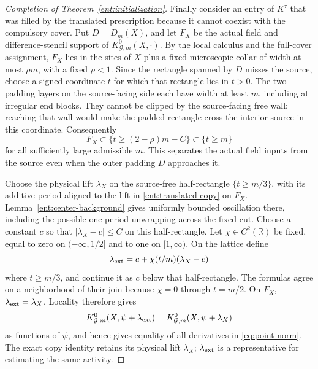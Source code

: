 \begin{proof}[Completion of Theorem~\ref{ent:initialization}]
Finally consider an entry of \(K^\tau\) that was filled
by the translated prescription because it cannot
coexist with the compulsory cover.  Put \(D=D_m(X)\), and let
\(F_X\) be the actual field and difference-stencil support of
\(K_{\mathcal G,m}^0(X,\cdot)\).  By the local calculus and the full-cover
assignment, \(F_X\) lies in the sites of \(X\) plus a fixed microscopic
collar of width at most \(\rho m\), with a fixed \(\rho<1\).
Since the rectangle spanned by \(D\) misses the source, choose a
signed coordinate \(t\) for which that rectangle lies in \(t>0\).
The two padding layers on the source-facing side each have width at
least \(m\), including at irregular end blocks.  They cannot be
clipped by the source-facing free wall: reaching that wall would make
the padded rectangle cross the interior source in this coordinate.
Consequently
\[
             F_X\subset\{t\ge(2-\rho)m-C\}\subset\{t\ge m\}
\]
for all sufficiently large admissible \(m\).  This separates the actual
field inputs from the source even when the outer padding \(D\) approaches it.

Choose the physical lift \(\lambda_X\) on the source-free half-rectangle
\(\{t\ge m/3\}\), with its additive period aligned to the lift in
\eqref{ent:translated-copy} on \(F_X\).  Lemma~\ref{ent:center-background}
gives uniformly bounded oscillation there, including the possible
one-period unwrapping across the fixed cut.  Choose a constant \(c\) so
that \(|\lambda_X-c|\le C\) on this half-rectangle.  Let
\(\chi\in C^2(\mathbb R)\) be fixed, equal to zero on
\((-\infty,1/2]\) and to one on \([1,\infty)\).  On the lattice define
\[
 \lambda_{\rm ext}
       =c+\chi(t/m)(\lambda_X-c)
\]
where \(t\ge m/3\), and continue it as \(c\) below that half-rectangle.
The formulas agree on a neighborhood of their join because \(\chi=0\)
through \(t=m/2\).  On \(F_X\), \(\lambda_{\rm ext}=\lambda_X\).
Locality therefore gives
\[
 K_{\mathcal G,m}^0(X,\psi+\lambda_{\rm ext})
       =K_{\mathcal G,m}^0(X,\psi+\lambda_X)
\]
as functions of \(\psi\), and hence gives equality of all derivatives
in \eqref{eq:point-norm}.  The exact copy identity retains its physical
lift \(\lambda_X\); \(\lambda_{\rm ext}\) is a representative for
estimating the same activity.


\end{proof}
